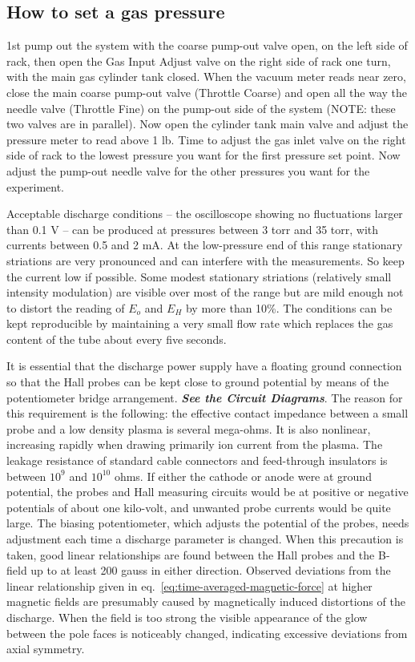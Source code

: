 \documentclass{../lab}
\begin{document}
\subsection{How to set a gas pressure}

1st pump out the system with the coarse pump-out valve open, on the left side of rack, then open the Gas Input Adjust valve on the right side of rack one turn, with the main gas cylinder tank closed. When the vacuum meter reads near zero, close the main coarse pump-out valve (Throttle Coarse) and open all the way the needle valve (Throttle Fine) on the pump-out side of the system (NOTE: these two valves are in parallel). Now open the cylinder tank main valve and adjust the pressure meter to read above 1 lb. Time to adjust the gas inlet valve on the right side of rack to the lowest pressure you want for the first pressure set point. Now adjust the pump-out needle valve for the other pressures you want for the experiment.

Acceptable discharge conditions -- the oscilloscope showing no fluctuations larger than 0.1 V -- can be produced at pressures between 3 torr and 35 torr, with currents between 0.5 and 2 mA. At the low-pressure end of this range stationary striations are very pronounced and can interfere with the measurements. So keep the current low if possible. Some modest stationary striations (relatively small intensity modulation) are visible over most of the range but are mild enough not to distort the reading of $E_o$ and $E_H$ by more than 10\%. The conditions can be kept reproducible by maintaining a very small flow rate which replaces the gas content of the tube about every five seconds.

It is essential that the discharge power supply have a floating ground connection so that the Hall probes can be kept close to ground potential by means of the potentiometer bridge arrangement. \emph{\textbf{See the Circuit Diagrams}}. The reason for this requirement is the following: the effective contact impedance between a small probe and a low density plasma is several mega-ohms. It is also nonlinear, increasing rapidly when drawing primarily ion current from the plasma. The leakage resistance of standard cable connectors and feed-through insulators is between $10^9$ and $10^{10}$ ohms. If either the cathode or anode were at ground potential, the probes and Hall measuring circuits would be at positive or negative potentials of about one kilo-volt, and unwanted probe currents would be quite large. The biasing potentiometer, which adjusts the potential of the probes, needs adjustment each time a discharge parameter is changed. When this precaution is taken, good linear relationships are found between the Hall probes and the B-field up to at least 200 gauss in either direction. Observed deviations from the linear relationship given in eq.~\eqref{eq:time-averaged-magnetic-force} at higher magnetic fields are presumably caused by magnetically induced distortions of the discharge. When the field is too strong the visible appearance of the glow between the pole faces is noticeably changed, indicating excessive deviations from axial symmetry.
\end{document}
